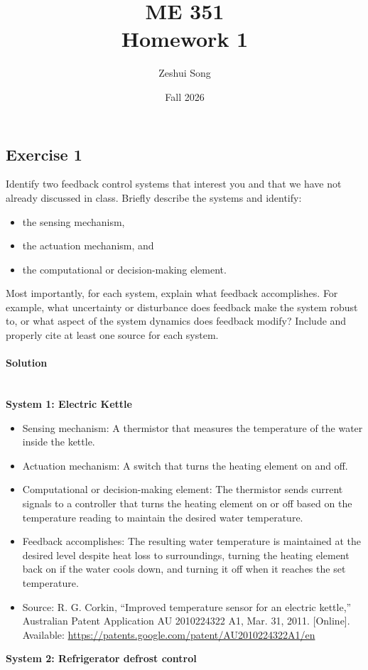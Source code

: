 \documentclass[11pt]{article}
\title{\textbf{ME 351}\\[0.5ex]\Large Homework 1}
\author{Zeshui Song}
\date{Fall 2026}
\begin{document}
\maketitle

\vspace{-1em}

\subsection*{Exercise 1}
Identify two feedback control systems that interest you and that we have not already discussed in class. Briefly describe the systems and identify:
\begin{itemize}
    \item the sensing mechanism,
    \item the actuation mechanism, and
    \item the computational or decision-making element.
\end{itemize}
Most importantly, for each system, explain what feedback accomplishes. For example, what uncertainty or disturbance does feedback make the system robust to, or what aspect of the system dynamics does feedback modify? Include and properly cite at least one source for each system.

\paragraph{Solution}\mbox{}\\

\noindent\textbf{System 1: Electric Kettle}
\begin{itemize}
    \item Sensing mechanism: A thermistor that measures the temperature of the water inside the kettle.
    \item Actuation mechanism: A switch that turns the heating element on and off.
    \item Computational or decision-making element: The thermistor sends current signals to a controller that turns the heating element on or off based on the temperature reading to maintain the desired water temperature.
    \item Feedback accomplishes: The resulting water temperature is maintained at the desired level despite heat loss to surroundings, turning the heating element back on if the water cools down, and turning it off when it reaches the set temperature.
    \item Source: R. G. Corkin, ``Improved temperature sensor for an electric kettle,''
Australian Patent Application AU 2010224322 A1, Mar. 31, 2011.
[Online]. Available:
\url{https://patents.google.com/patent/AU2010224322A1/en}
\end{itemize}
\textbf{System 2: Refrigerator defrost control}
\end{document}
